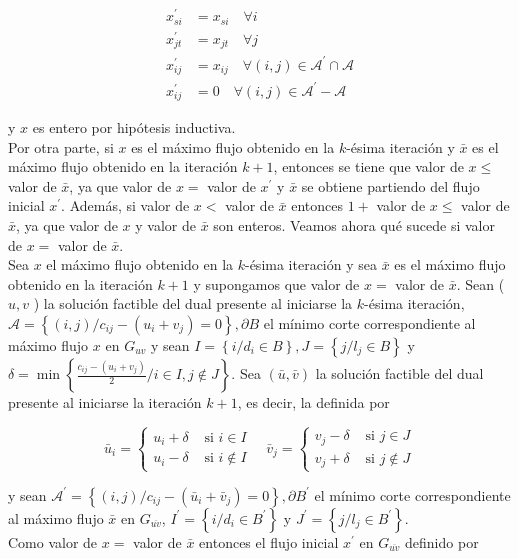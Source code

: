 \documentclass[10pt]{article}
\begin{document}
$$
\begin{aligned}
x_{s i}^{\prime} & =x_{s i} \quad \forall i \\
x_{j t}^{\prime} & =x_{j t} \quad \forall j \\
x_{i j}^{\prime} & =x_{i j} \quad \forall(i, j) \in \mathcal{A}^{\prime} \cap \mathcal{A} \\
x_{i j}^{\prime} & =0 \quad \forall(i, j) \in \mathcal{A}^{\prime}-\mathcal{A}
\end{aligned}
$$

y $x$ es entero por hipótesis inductiva.\\
Por otra parte, si $x$ es el máximo flujo obtenido en la $k$-ésima iteración y $\bar{x}$ es el máximo flujo obtenido en la iteración $k+1$, entonces se tiene que valor de $x \leq$ valor de $\bar{x}$, ya que valor de $x=$ valor de $x^{\prime}$ y $\bar{x}$ se obtiene partiendo del flujo inicial $x^{\prime}$. Además, si valor de $x<$ valor de $\bar{x}$ entonces $1+$ valor de $x \leq$ valor de $\bar{x}$, ya que valor de $x$ y valor de $\bar{x}$ son enteros. Veamos ahora qué sucede si valor de $x=$ valor de $\bar{x}$.\\
Sea $x$ el máximo flujo obtenido en la $k$-ésima iteración y sea $\bar{x}$ es el máximo flujo obtenido en la iteración $k+1$ y supongamos que valor de $x=$ valor de $\bar{x}$. Sean ( $u, v$ ) la solución factible del dual presente al iniciarse la $k$-ésima iteración, $\mathcal{A}=\left\{(i, j) / c_{i j}-\left(u_{i}+v_{j}\right)=0\right\}, \partial B$ el mínimo corte correspondiente al máximo flujo $x$ en $G_{u v}$ y sean $I=\left\{i / d_{i} \in B\right\}, J=\left\{j / l_{j} \in B\right\}$ y $\delta=\min \left\{\frac{c_{i j}-\left(u_{i}+v_{j}\right)}{2} / i \in I, j \notin J\right\}$. Sea $(\bar{u}, \bar{v})$ la solución factible del dual presente al iniciarse la iteración $k+1$, es decir, la definida por

$$
\bar{u}_{i}=\left\{\begin{array}{ll}
u_{i}+\delta & \text { si } i \in I \\
u_{i}-\delta & \text { si } i \notin I
\end{array} \quad \bar{v}_{j}= \begin{cases}v_{j}-\delta & \text { si } j \in J \\
v_{j}+\delta & \text { si } j \notin J\end{cases}\right.
$$

y sean $\mathcal{A}^{\prime}=\left\{(i, j) / c_{i j}-\left(\bar{u}_{i}+\bar{v}_{j}\right)=0\right\}, \partial B^{\prime}$ el mínimo corte correspondiente al máximo flujo $\bar{x}$ en $G_{\overline{u v}}$, $I^{\prime}=\left\{i / d_{i} \in B^{\prime}\right\}$ y $J^{\prime}=\left\{j / l_{j} \in B^{\prime}\right\}$.\\
Como valor de $x=$ valor de $\bar{x}$ entonces el flujo inicial $x^{\prime}$ en $G_{\overline{u v}}$ definido por
\end{document}
